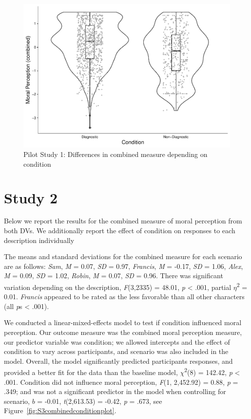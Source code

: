\documentclass[
  american,
  man,mask,floatsintext]{apa6}
\begin{document}
\begin{figure}[!h]
\includegraphics[width=\textwidth,]{Supplementary_files/figure-latex/pilot2cobminedconditionplot-1} \caption{Pilot Study 1: Differences in combined measure depending on condition}\label{fig:pilot2cobminedconditionplot}
\end{figure}

\newpage

\hypertarget{study-2}{%
\section{Study 2}\label{study-2}}

Below we report the results for the combined measure of moral perception from both DVs. We additionally report the effect of condition on responses to each description individually

The means and standard deviations for the combined measure for each scenario are as follows:
\emph{Sam},
\emph{M} = 0.07, \emph{SD} = 0.97,
\emph{Francis},
\emph{M} = -0.17, \emph{SD} = 1.06,
\emph{Alex},
\emph{M} = 0.09, \emph{SD} = 1.02,
\emph{Robin},
\emph{M} = 0.07, \emph{SD} = 0.96. There was significant variation depending on the description, \emph{F}(3,2335) = 48.01, \emph{p} \textless{} .001, partial \(\eta\)\textsuperscript{2} = 0.01. \emph{Francis} appeared to be rated as the less favorable than all other characters (all \emph{p}s \textless{} .001).

We conducted a linear-mixed-effects model to test if condition influenced moral perception. Our outcome measure was the combined moral perception measure, our predictor variable was condition; we allowed intercepts and the effect of condition to vary across participants, and scenario was also included in the model.
Overall, the model significantly predicted participants responses, and provided a better fit for the data than the baseline model, \(\chi\)\textsuperscript{2}(8) = 142.42, \emph{p} \textless{} .001. Condition did not influence moral perception, \emph{F}(1, 2,452.92) = 0.88, \emph{p} = .349; and was not a significant predictor in the model when controlling for scenario, \(b\) = -0.01, \emph{t}(2,613.53) = -0.42, \emph{p} = .673, see Figure~\ref{fig:S3combinedconditionplot}.
\end{document}
